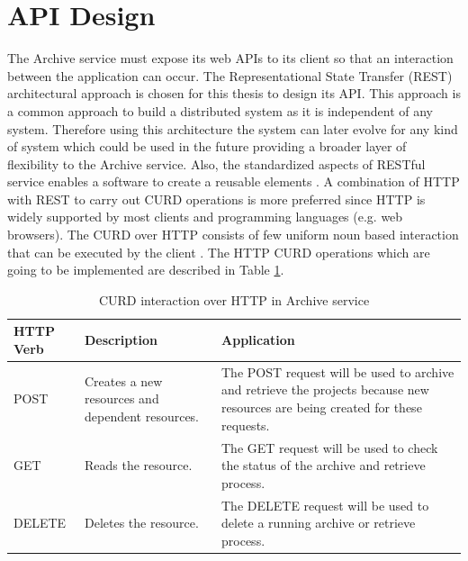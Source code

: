 \section{API Design}
    The Archive service must expose its web APIs to its client so that an interaction between the application can occur.
    The Representational State Transfer (REST) \cite[Chapter.~5]{REST} architectural approach is chosen for this thesis
    to design its API. This approach is a 
    common approach to build a distributed system as it is independent of any system. Therefore using this architecture the system can later 
    evolve for any kind of system which could be used in the future providing a broader layer of flexibility to the Archive service. 
    Also, the standardized aspects of RESTful service enables a software to create a reusable elements \cite{RESTThesis}. A combination of HTTP with REST to carry out
    CURD operations is more preferred since HTTP is widely supported by most clients and programming languages (e.g. web browsers).
    The CURD over HTTP consists of few uniform noun based interaction that can be executed by the client \cite[p.~13]{RESTThesis}. The
    HTTP CURD operations which are going to be implemented are described in Table \ref{table:curdHttp}.

    \begin{table}[h!]
        \centering
        \begin{tabular}{|p{2cm}|p{4cm}|p{7cm}|}
            \hline
                \textbf{HTTP Verb}  & \textbf{Description} & \textbf{Application}\\
            \hline
                POST & 
                Creates a new resources and dependent resources.
                & The POST request will be used to archive and retrieve the projects because new resources are being created for these requests.\\
            \hline
                GET & Reads the resource. & The GET request will be used to check the status of the archive and retrieve process. \\
            \hline
                DELETE & Deletes the resource. & The DELETE request will be used to delete a running archive or retrieve process. \\                
            \hline
        \end{tabular}
        \caption{CURD interaction over HTTP in Archive service}
        \label{table:curdHttp}     
    \end{table}   
    
